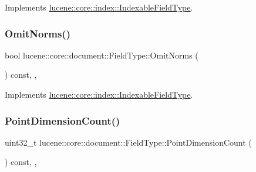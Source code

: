 Implements \mbox{\hyperlink{classlucene_1_1core_1_1index_1_1IndexableFieldType_afe678be1fafcb17c6142fc662ee793e4}{lucene\+::core\+::index\+::\+Indexable\+Field\+Type}}.

\mbox{\label{classlucene_1_1core_1_1document_1_1FieldType_adf65107f5dfea8171b284e14bc7344f5}} 
\subsubsection{\texorpdfstring{Omit\+Norms()}{OmitNorms()}}
{\footnotesize\ttfamily bool lucene\+::core\+::document\+::\+Field\+Type\+::\+Omit\+Norms (\begin{DoxyParamCaption}{ }\end{DoxyParamCaption}) const\hspace{0.3cm}{\ttfamily [inline]}, {\ttfamily [virtual]}, {\ttfamily [noexcept]}}



Implements \mbox{\hyperlink{classlucene_1_1core_1_1index_1_1IndexableFieldType_afc45bc2031d22fc941ea89b1ba881526}{lucene\+::core\+::index\+::\+Indexable\+Field\+Type}}.

\mbox{\label{classlucene_1_1core_1_1document_1_1FieldType_ad9774147fe3ca9abf5f66870e4083363}} 
\subsubsection{\texorpdfstring{Point\+Dimension\+Count()}{PointDimensionCount()}}
{\footnotesize\ttfamily uint32\+\_\+t lucene\+::core\+::document\+::\+Field\+Type\+::\+Point\+Dimension\+Count (\begin{DoxyParamCaption}{ }\end{DoxyParamCaption}) const\hspace{0.3cm}{\ttfamily [inline]}, {\ttfamily [virtual]}, {\ttfamily [noexcept]}}



